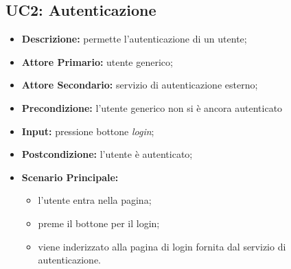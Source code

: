 \subsection{UC2: Autenticazione}
\label{sec:UC2}
\begin{itemize}
    \item \textbf{Descrizione:} permette l'autenticazione di un utente;
    \item \textbf{Attore Primario:} utente generico;
    \item \textbf{Attore Secondario:} servizio di autenticazione esterno;
    \item \textbf{Precondizione:} l'utente generico non si è ancora autenticato
    \item \textbf{Input:} pressione bottone \textit{login};
    \item \textbf{Postcondizione:} l'utente è autenticato;
    \item \textbf{Scenario Principale:}
          \begin{itemize}
              \item l'utente entra nella pagina;
              \item preme il bottone per il login;
              \item viene inderizzato alla pagina di login fornita dal servizio di autenticazione.
          \end{itemize}
\end{itemize}